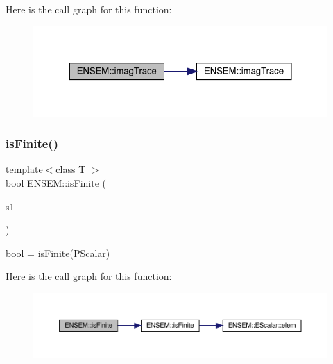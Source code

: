 Here is the call graph for this function\+:\nopagebreak
\begin{figure}[H]
\begin{center}
\leavevmode
\includegraphics[width=324pt]{db/dcc/group__primscalar_gaf760659a12c2bd7668440d8b83333086_cgraph}
\end{center}
\end{figure}
\mbox{\label{group__primscalar_ga3dab2cae6c55a7a86676323b203a758d}} 
\subsubsection{\texorpdfstring{isFinite()}{isFinite()}}
{\footnotesize\ttfamily template$<$class T $>$ \\
bool E\+N\+S\+E\+M\+::is\+Finite (\begin{DoxyParamCaption}\item[{const \mbox{\hyperlink{classENSEM_1_1PScalar}{P\+Scalar}}$<$ T $>$ \&}]{s1 }\end{DoxyParamCaption})}



bool = is\+Finite(\+P\+Scalar) 

Here is the call graph for this function\+:\nopagebreak
\begin{figure}[H]
\begin{center}
\leavevmode
\includegraphics[width=350pt]{db/dcc/group__primscalar_ga3dab2cae6c55a7a86676323b203a758d_cgraph}
\end{center}
\end{figure}
\mbox{\label{group__primscalar_gadaa3bcd952c27bc79132fc1037584dcc}} 
